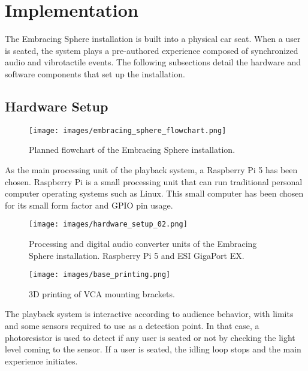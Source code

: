 \chapter{Implementation}
    The Embracing Sphere installation is built into a physical car seat. When a user is seated, the system plays a pre-authored experience composed of synchronized audio and vibrotactile events. The following subsections detail the hardware and software components that set up the installation.\par
    \section{Hardware Setup}
        \begin{figure}[H]
            \centering
            \texttt{[image: images/embracing\_sphere\_flowchart.png]}
            \caption{Planned flowchart of the Embracing Sphere installation.}
            \label{fig:ES_FLOW}
        \end{figure}

        As the main processing unit of the playback system, a Raspberry Pi 5 has been chosen. Raspberry Pi is a small processing unit that can run traditional personal computer operating systems such as Linux. This small computer has been chosen for its small form factor and GPIO pin usage.\par

        \begin{figure}[H]
            \centering
            \texttt{[image: images/hardware\_setup\_02.png]}
            \caption{Processing and digital audio converter units of the Embracing Sphere installation. Raspberry Pi 5 and ESI GigaPort EX.}
            \label{fig:HARD_SETUP_01}
        \end{figure}

        \begin{figure}[H]
            \centering
            \texttt{[image: images/base\_printing.png]}
            \caption{3D printing of VCA mounting brackets.}
            \label{fig:HARD_SETUP_06}
        \end{figure}

        The playback system is interactive according to audience behavior, with limits and some sensors required to use as a detection point. In that case, a photoresistor is used to detect if any user is seated or not by checking the light level coming to the sensor. If a user is seated, the idling loop stops and the main experience initiates.\par      

